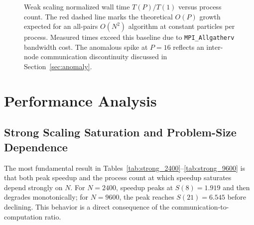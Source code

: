 \documentclass[11pt]{article}
\begin{document}
\begin{figure}[H]
  \centering
  \caption{Weak scaling normalized wall time $T(P)/T(1)$ versus process count. The red dashed line marks the theoretical $O(P)$ growth expected for an all-pairs $O(N^2)$ algorithm at constant particles per process. Measured times exceed this baseline due to \texttt{MPI\_Allgatherv} bandwidth cost. The anomalous spike at $P = 16$ reflects an inter-node communication discontinuity discussed in Section~\ref{sec:anomaly}.}
  \label{fig:weak}
\end{figure}

\section{Performance Analysis}

\subsection{Strong Scaling Saturation and Problem-Size Dependence}

The most fundamental result in Tables~\ref{tab:strong_2400}--\ref{tab:strong_9600} is that both peak speedup and the process count at which speedup saturates depend strongly on $N$. For $N = 2400$, speedup peaks at $S(8) = 1.919$ and then degrades monotonically; for $N = 9600$, the peak reaches $S(21) = 6.545$ before declining. This behavior is a direct consequence of the communication-to-computation ratio.
\end{document}

